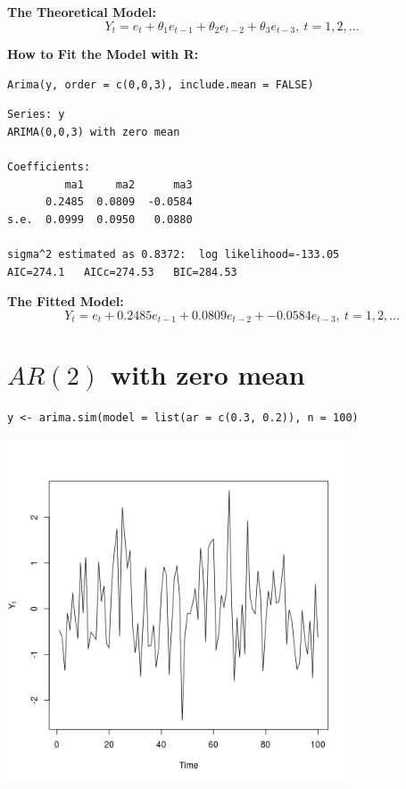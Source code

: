 \documentclass[12pt]{article}
\begin{document}
\noindent
\textbf{The Theoretical Model:} 
\[
Y_{t} = e_{t} + \theta_{1}e_{t - 1} + \theta_{2}e_{t - 2} + \theta_{3}e_{t - 3},\ t = 1,2,\ldots
\]

\noindent
\textbf{How to Fit the Model with R:}

\begin{verbatim}
Arima(y, order = c(0,0,3), include.mean = FALSE)
\end{verbatim}




\begin{verbatim}
Series: y 
ARIMA(0,0,3) with zero mean     

Coefficients:
         ma1     ma2      ma3
      0.2485  0.0809  -0.0584
s.e.  0.0999  0.0950   0.0880

sigma^2 estimated as 0.8372:  log likelihood=-133.05
AIC=274.1   AICc=274.53   BIC=284.53
\end{verbatim}

\noindent
\textbf{The Fitted Model:} 
\[
Y_{t} = e_{t} + 0.2485 e_{t - 1} + 0.0809 e_{t - 2} + -0.0584 e_{t - 3},\ t = 1,2,\ldots
\]
\section*{$AR(2)$ with zero mean}
\label{sec-2}


\begin{verbatim}
y <- arima.sim(model = list(ar = c(0.3, 0.2)), n = 100)
\end{verbatim}





\includegraphics[width=4.0in]{img/ar2zm.png}
\end{document}

